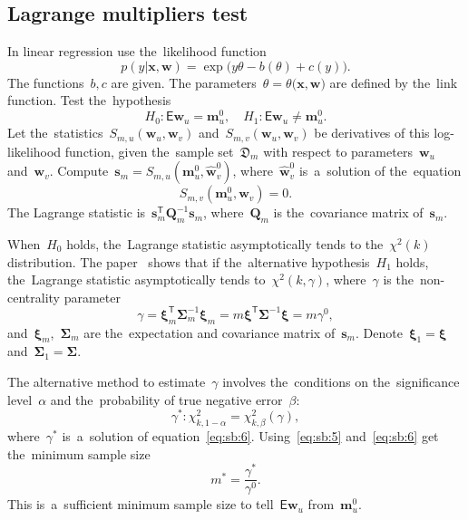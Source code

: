 \documentclass[
11pt,%
tightenlines,%
twoside,%
onecolumn,%
nofloats,%
nobibnotes,%
nofootinbib,%
superscriptaddress,%
noshowpacs,%
centertags]%
{revtex4}
\begin{document}
\subsection{Lagrange multipliers test}
In linear regression use the~likelihood function
\[
\label{eq:sb:1}
	p(y|\mathbf{x}, \mathbf{w}) = \exp\bigl(y\theta- b(\theta) + c\left(y\right)\bigr).
\]
The functions~$b, c$ are given. The parameters~$\theta=\theta\bigr(\mathbf{x}, \mathbf{w}\bigr)$ are defined by the~link function. Test the~hypothesis
\[
\label{eq:sb:2}
	H_0: \mathsf{E}\mathbf{w}_{u} = \mathbf{m}^0_{u}, \quad H_1: \mathsf{E}\mathbf{w}_{u} \not= \mathbf{m}^0_{u}.
\]
Let the~statistics~$S_{m,u}\left(\mathbf{w}_{u}, \mathbf{w}_{v}\right)$ and~$S_{m,v}\left(\mathbf{w}_{u}, \mathbf{w}_{v}\right)$ be derivatives of this log-likelihood function, given the~sample set~$\mathfrak{D}_{m}$ with respect to parameters~$\mathbf{w}_{u}$ and~$\mathbf{w}_{v}$.
Compute~$\mathbf{s}_{m} = S_{m,u}\left(\mathbf{m}^{0}_{u}, \hat{\mathbf{w}}^{0}_{v}\right)$, where~$\hat{\mathbf{w}}^{0}_{v}$ is~a~solution of the~equation
\[
\label{eq:sb:3}
	S_{m,v}\left(\mathbf{m}^{0}_{u}, \mathbf{w}_{v}\right) = 0.
\]
The Lagrange statistic is~$\mathbf{s}^{\mathsf{T}}_{m}\mathbf{Q}_{m}^{-1}\mathbf{s}_{m}$, where~$\mathbf{Q}_{m}$ is the~covariance matrix of~$\mathbf{s}_{m}$.
	
When~$H_0$ holds, the~Lagrange statistic asymptotically tends to the~$\chi^2(k)$ distribution. The paper~\cite{self1988} shows that if the~alternative hypothesis~$H_1$ holds, the~Lagrange statistic asymptotically tends to~$\chi^2(k,\gamma)$, where~$\gamma$ is the~non-centrality parameter
\[
\label{eq:sb:5}
	\gamma = \bm{\xi}_{m}^{\mathsf{T}}\bm{\Sigma}^{-1}_{m}\bm{\xi}_{m} = m\bm{\xi}^{\mathsf{T}}\bm{\Sigma}^{-1}\bm{\xi}= m\gamma^0,
\]
and~$\bm{\xi}_{m}$,~$\bm{\Sigma}_{m}$ are the~expectation and covariance matrix of~$\mathbf{s}_{m}$. Denote~$\bm{\xi}_1 = \bm{\xi}$ and~$\bm{\Sigma}_1 = \bm{\Sigma}$. 
	
The alternative method to estimate~$\gamma$ involves the~conditions on the~significance level~$\alpha$ and the~probability of true negative error~$\beta$:
\[
\label{eq:sb:6}
	\gamma^*: \chi^2_{k, 1-\alpha} = \chi^2_{k, \beta}\left(\gamma\right),
\]
where~$\gamma^*$ is~a~solution of equation~\eqref{eq:sb:6}.
Using~\eqref{eq:sb:5} and~\eqref{eq:sb:6} get the~minimum sample size
\[
\label{eq:sb:7}
	m^* = \frac{\gamma^*}{\gamma^0}.
\]
This is~a~sufficient minimum sample size to tell~$\mathsf{E}\mathbf{w}_{u}$ from~$\mathbf{m}^0_{u}$.
\end{document}
